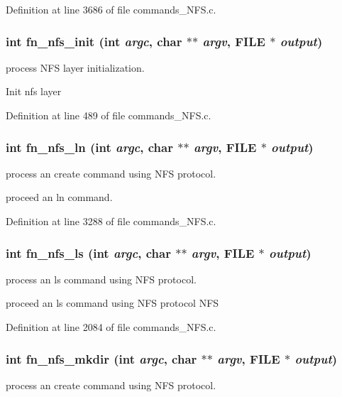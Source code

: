 Definition at line 3686 of file commands\_\-NFS.c.
\subsubsection[{fn\_\-nfs\_\-init}]{\setlength{\rightskip}{0pt plus 5cm}int fn\_\-nfs\_\-init (int {\em argc}, \/  char $\ast$$\ast$ {\em argv}, \/  FILE $\ast$ {\em output})}\label{commands_8h_a3888e7f1af730319f7a0ff8b28a2268f}
process NFS layer initialization.

Init nfs layer 

Definition at line 489 of file commands\_\-NFS.c.
\subsubsection[{fn\_\-nfs\_\-ln}]{\setlength{\rightskip}{0pt plus 5cm}int fn\_\-nfs\_\-ln (int {\em argc}, \/  char $\ast$$\ast$ {\em argv}, \/  FILE $\ast$ {\em output})}\label{commands_8h_ac030f04189dccaf1c907d78c250c0ea0}
process an create command using NFS protocol.

proceed an ln command. 

Definition at line 3288 of file commands\_\-NFS.c.
\subsubsection[{fn\_\-nfs\_\-ls}]{\setlength{\rightskip}{0pt plus 5cm}int fn\_\-nfs\_\-ls (int {\em argc}, \/  char $\ast$$\ast$ {\em argv}, \/  FILE $\ast$ {\em output})}\label{commands_8h_a4d233995059a84db95c99ebc1e773d51}
process an ls command using NFS protocol.

proceed an ls command using NFS protocol NFS 

Definition at line 2084 of file commands\_\-NFS.c.
\subsubsection[{fn\_\-nfs\_\-mkdir}]{\setlength{\rightskip}{0pt plus 5cm}int fn\_\-nfs\_\-mkdir (int {\em argc}, \/  char $\ast$$\ast$ {\em argv}, \/  FILE $\ast$ {\em output})}\label{commands_8h_a0e472c68ced403215582ac08170cf489}
process an create command using NFS protocol.

